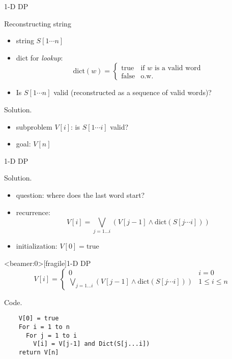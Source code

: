 \begin{frame}{1-D DP}
  \begin{exampleblock}{Reconstructing string }
    \begin{itemize}
      \item string $S[1 \cdots n]$
      \item dict for \emph{lookup}:
	\begin{displaymath}
	  \text{dict}(w) = \left\{ \begin{array}{ll}
	    \text{true} & \textrm{if } w \textrm{ is a valid word}\\
	    \text{false} & \textrm{o.w.}
	  \end{array} \right.
	\end{displaymath}
      \item Is $S[1 \cdots n]$ valid (reconstructed as a sequence of valid words)?
    \end{itemize}
  \end{exampleblock}

  \begin{block}{Solution.}
    \begin{itemize}
      \item subproblem $V[i]$: is $S[1 \cdots i]$ valid?
      \item goal: $V[n]$
    \end{itemize}
  \end{block}
\end{frame}
\begin{frame}{1-D DP}
  \begin{block}{Solution.}
    \begin{itemize}
      \item question: where does the last word start? %
      \item recurrence: 
	\[ 
	  V[i] = \bigvee_{j = 1 \ldots i} (V[j-1] \land \text{dict}(S[j \cdots i]))
	\]
      \item initialization: $V[0] = \text{true}$
    \end{itemize}
  \end{block}
\end{frame}
\begin{frame}<beamer:0>[fragile]{1-D DP}
    \begin{displaymath}
      V[i] = \left\{ \begin{array}{ll}
	0 & i = 0 \\
	\bigvee_{j = 1 \ldots i} (V[j-1] \land \text{dict}(S[j \cdots i])) & 1 \le i \le n
      \end{array} \right.
    \end{displaymath}

  \begin{block}{Code.}
    \begin{verbatim}
    V[0] = true
    For i = 1 to n
      For j = 1 to i
        V[i] = V[j-1] and Dict(S[j...i])
    return V[n]
    \end{verbatim}
  \end{block}
\end{frame}
